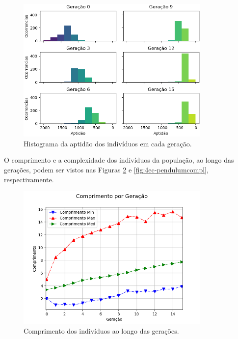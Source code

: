 \begin{figure}[H]
	\centering
	\includegraphics[width=0.85\textwidth]{02_desenvolvimento/04_EC_Fig_PendulumAptHist.png}
	\caption{Histograma da aptidão dos indivíduos em cada geração.}
	\label{fig:4ec-pendulumapthist}
\end{figure}

O comprimento e a complexidade dos indivíduos da população, ao longo das gerações, podem ser vistos nas Figuras \ref{fig:4ec-pendulumcompr} e \ref{fig:4ec-pendulumcompl}, respectivamente.

\begin{figure}[H]
	\centering
	\includegraphics[width=0.85\textwidth]{02_desenvolvimento/04_EC_Fig_PendulumCompr.png}
	\caption{Comprimento dos indivíduos ao longo das gerações.}
	\label{fig:4ec-pendulumcompr}
\end{figure}

